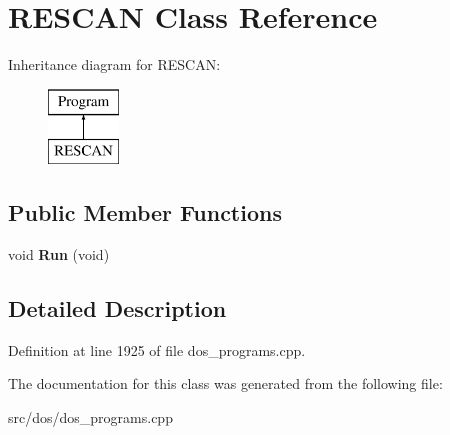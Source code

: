 \hypertarget{classRESCAN}{\section{R\-E\-S\-C\-A\-N Class Reference}
\label{classRESCAN}
}
Inheritance diagram for R\-E\-S\-C\-A\-N\-:\begin{figure}[H]
\begin{center}
\leavevmode
\includegraphics[height=2.000000cm]{classRESCAN}
\end{center}
\end{figure}
\subsection*{Public Member Functions}
\begin{DoxyCompactItemize}
\item 
\hypertarget{classRESCAN_af3bea53bb1105100a4703c239c701df6}{void {\bfseries Run} (void)}\label{classRESCAN_af3bea53bb1105100a4703c239c701df6}

\end{DoxyCompactItemize}


\subsection{Detailed Description}


Definition at line 1925 of file dos\-\_\-programs.\-cpp.



The documentation for this class was generated from the following file\-:\begin{DoxyCompactItemize}
\item 
src/dos/dos\-\_\-programs.\-cpp\end{DoxyCompactItemize}
